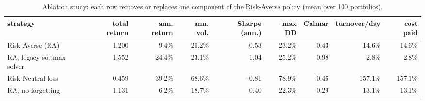 \begin{table}[ht!]
\centering
\footnotesize
\setlength{\tabcolsep}{4pt}
\begin{tabular}{lrrrrrrrr}
\hline
strategy & total return & ann. return & ann. vol. & Sharpe (ann.) & max DD & Calmar & turnover/day & cost paid \\
\hline
Risk-Averse (RA) & 1.200 & 9.4\% & 20.2\% & 0.53 & -23.2\% & 0.43 & 14.6\% & 14.6\% \\
RA, legacy softmax solver & 1.552 & 24.4\% & 23.1\% & 1.04 & -25.2\% & 0.98 & 2.8\% & 2.8\% \\
Risk-Neutral loss & 0.459 & -39.2\% & 68.6\% & -0.81 & -78.9\% & -0.46 & 157.1\% & 157.1\% \\
RA, no forgetting & 1.131 & 6.2\% & 18.7\% & 0.40 & -22.3\% & 0.29 & 13.1\% & 13.1\% \\
\hline
\end{tabular}
\caption{Ablation study: each row removes or replaces one component of the Risk-Averse policy (mean over 100 portfolios).}
\label{tab:ablation_oos2026}
\end{table}
